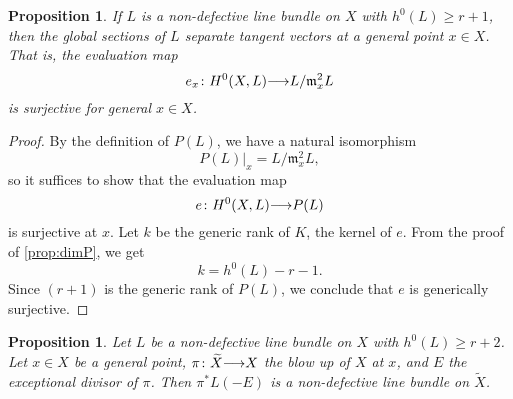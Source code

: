 \documentclass[11pt,reqno]{amsart}
\theoremstyle{plain}
\newtheorem{proposition}[theorem]{Proposition}
\theoremstyle{definition}
\theoremstyle{remark}
\numberwithin{equation}{section}
\renewcommand{\to}{{\longrightarrow}}
\numberwithin{equation}{section}
\begin{document}
\begin{proposition}
  \label{prop:genericSeparateTangents}
  If $L$ is a non-defective line bundle on $X$ with $h^{0}(L) \geq r+1$, then the global sections of $L$ separate tangent vectors at a general point $x \in X$.
  That is, the evaluation map
  \[e_{x}\from H^{0}(X,L) \to L/\mathfrak m_x^2 L\]
  is surjective for general $x \in X$.
\end{proposition}
\begin{proof}
  By the definition of $P(L)$, we have a natural isomorphism
  \[ P(L)|_x = L/\mathfrak m_x^2 L,\]
  so it suffices to show that the evaluation map
  \[ e \from H^0(X,L) \to P(L)\]
  is surjective at $x$.
  Let $k$ be the generic rank of $K$, the kernel of $e$.
  From the proof of \autoref{prop:dimP}, we get
  \[  k = h^0(L) - r - 1.\]
  Since $(r+1)$ is the generic rank of $P(L)$, we conclude that $e$ is generically surjective.
\end{proof}


\begin{proposition}
  \label{prop:blowuppoint}
  Let $L$ be a non-defective line bundle on $X$ with $h^0(L) \geq r+2$.
  Let $x \in X$ be a general point, $\pi \from \widetilde{X} \to X$ the blow up of $X$ at $x$, and $E$ the exceptional divisor of $\pi$.
  Then $\pi^{*}L (-E)$ is a non-defective line bundle on $\widetilde X$.
\end{proposition}
\end{document}
